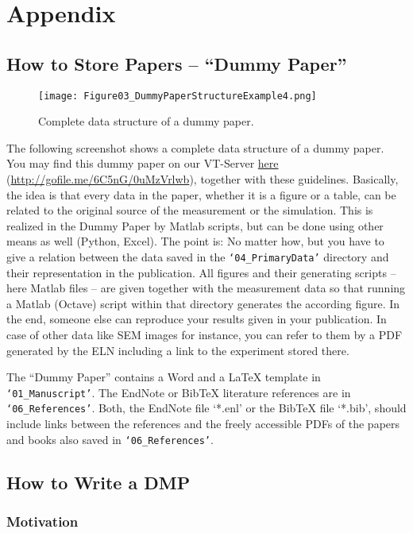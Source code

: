 \section{Appendix}
\subsection{How to Store Papers – “Dummy Paper”}\label{app:dummy-paper}
\begin{wrapfigure}{r}{0.5\linewidth}
  \vspace{-1em}
  \texttt{[image: Figure03\_DummyPaperStructureExample4.png]}
  \caption{Complete data structure of a dummy paper.}
  \label{fig:dummy-paper}
\end{wrapfigure}
The following screenshot shows a complete data structure of a dummy paper.
You may find this dummy paper on our VT-Server
\href{http://gofile.me/6C5nG/0uMzVrlwb}{here}
(\url{http://gofile.me/6C5nG/0uMzVrlwb}),
together with these guidelines. Basically, the idea is that every data in the
paper, whether it is a figure or a table, can be related to the original source
of the measurement or the simulation. This is realized in the Dummy Paper by
Matlab scripts, but can be done using other means as well (Python, Excel). The
point is: No matter how, but you have to give a relation between the data saved
in the \texttt{‘04\_PrimaryData’} directory and their representation in the
publication. All figures and their generating scripts – here Matlab files – are
given together with the measurement data so that running a Matlab (Octave)
script within that directory generates the according figure. In the end, someone
else can reproduce your results given in your publication. In case of other data
like SEM images for instance, you can refer to them by a PDF generated by the
ELN including a link to the experiment stored there.

The “Dummy Paper” contains a Word and a LaTeX template in
\texttt{‘01\_Manuscript’}. The EndNote or BibTeX literature references are in
\texttt{‘06\_References’}. Both, the EndNote file ‘*.enl’ or the BibTeX file
‘*.bib’, should include links between the references and the freely accessible
PDFs of the papers and books also saved in \texttt{‘06\_References’}.

\subsection{How to Write a DMP}

\subsubsection{Motivation}

